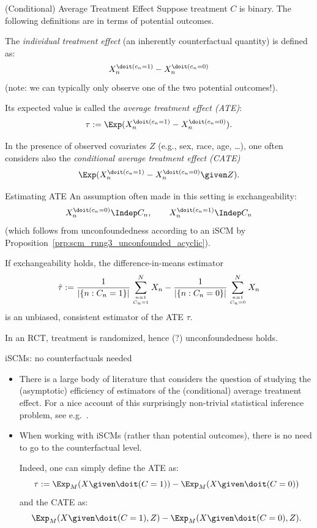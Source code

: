 \begin{frame}{(Conditional) Average Treatment Effect}
  Suppose treatment $C$ is binary. The following definitions are in terms of potential outcomes.

  \bigskip
  The \emph{individual treatment effect} (an inherently counterfactual quantity) is defined as:
  $$X_n^{\doit(c_n=1)} - X_n^{\doit(c_n=0)}$$
  (note: we can typically only observe one of the two potential outcomes!).

  \bigskip
  Its expected value is called the \emph{average treatment effect (ATE)}:
  $$\tau := \Exp(X_n^{\doit(c_n=1)} - X_n^{\doit(c_n=0)}).$$

  \bigskip
  In the presence of observed covariates $Z$ (e.g., sex, race, age, \dots), one often considers also the \emph{conditional average treatment effect (CATE)}
  $$\Exp(X_n^{\doit(c_n=1)} - X_n^{\doit(c_n=0)} \given Z).$$
\end{frame}

\begin{frame}{Estimating ATE}
  An assumption often made in this setting is exchangeability:
  $$X_n^{\doit(c_n=0)} \Indep C_n, \qquad X_n^{\doit(c_n=1)} \Indep C_n$$
  (which follows from unconfoundedness according to an iSCM by Proposition~\ref{prp:scm_rung3_unconfounded_acyclic}).

  \begin{Prp}
  If exchangeability holds, the difference-in-means estimator 
    $$\hat{\tau} := \frac{1}{|\{n : C_n=1\}|} \sum_{n=1 \atop C_n=1}^N X_n - \frac{1}{|\{n : C_n=0\}|} \sum_{n=1 \atop C_n=0}^N X_n$$
  is an unbiased, consistent estimator of the ATE $\tau$.
  \end{Prp}

  In an RCT, treatment is randomized, hence (?) unconfoundedness holds.
\end{frame}

\begin{frame}{iSCMs: no counterfactuals needed}
  \begin{itemize}
    \item There is a large body of literature that considers the
  question of studying the (asymptotic) efficiency of estimators of the (conditional)
  average treatment effect. For a nice account of this surprisingly non-trivial statistical inference problem, 
  see e.g.\ \cite{Wager2020}.

\item When working with iSCMs (rather than potential outcomes), there is no need to go to the counterfactual level. 
  
  Indeed, one can simply define the ATE as:
  $$\tau := \Exp_{M}(X \given \doit(C=1)) - \Exp_{M}(X \given \doit(C=0))$$
  and the CATE as:
  $$\Exp_{M}(X \given \doit(C=1),Z) - \Exp_{M}(X \given \doit(C=0),Z).$$
  \end{itemize}

\end{frame}

